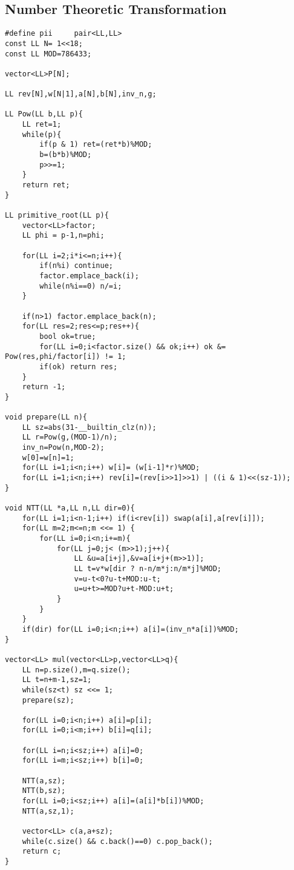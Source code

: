 \documentclass[10pt,a4paper,onesided]{article}
\begin{document}
\begin{multicols*}{3}
\subsection{Number Theoretic Transformation}
\begin{lstlisting}
#define pii     pair<LL,LL>
const LL N= 1<<18;
const LL MOD=786433;

vector<LL>P[N];

LL rev[N],w[N|1],a[N],b[N],inv_n,g;

LL Pow(LL b,LL p){
    LL ret=1;
    while(p){
        if(p & 1) ret=(ret*b)%MOD;
        b=(b*b)%MOD;
        p>>=1;
    }
    return ret;
}

LL primitive_root(LL p){
    vector<LL>factor;
    LL phi = p-1,n=phi;

    for(LL i=2;i*i<=n;i++){
        if(n%i) continue;
        factor.emplace_back(i);
        while(n%i==0) n/=i;
    }

    if(n>1) factor.emplace_back(n);
    for(LL res=2;res<=p;res++){
        bool ok=true;
        for(LL i=0;i<factor.size() && ok;i++) ok &= Pow(res,phi/factor[i]) != 1;
        if(ok) return res;
    }
    return -1;
}

void prepare(LL n){
    LL sz=abs(31-__builtin_clz(n));
    LL r=Pow(g,(MOD-1)/n);
    inv_n=Pow(n,MOD-2);
    w[0]=w[n]=1;
    for(LL i=1;i<n;i++) w[i]= (w[i-1]*r)%MOD;
    for(LL i=1;i<n;i++) rev[i]=(rev[i>>1]>>1) | ((i & 1)<<(sz-1));
}

void NTT(LL *a,LL n,LL dir=0){
    for(LL i=1;i<n-1;i++) if(i<rev[i]) swap(a[i],a[rev[i]]);
    for(LL m=2;m<=n;m <<= 1) {
        for(LL i=0;i<n;i+=m){
            for(LL j=0;j< (m>>1);j++){
                LL &u=a[i+j],&v=a[i+j+(m>>1)];
                LL t=v*w[dir ? n-n/m*j:n/m*j]%MOD;
                v=u-t<0?u-t+MOD:u-t;
                u=u+t>=MOD?u+t-MOD:u+t;
            }
        }
    }
    if(dir) for(LL i=0;i<n;i++) a[i]=(inv_n*a[i])%MOD;
}

vector<LL> mul(vector<LL>p,vector<LL>q){
    LL n=p.size(),m=q.size();
    LL t=n+m-1,sz=1;
    while(sz<t) sz <<= 1;
    prepare(sz);

    for(LL i=0;i<n;i++) a[i]=p[i];
    for(LL i=0;i<m;i++) b[i]=q[i];

    for(LL i=n;i<sz;i++) a[i]=0;
    for(LL i=m;i<sz;i++) b[i]=0;

    NTT(a,sz);
    NTT(b,sz);
    for(LL i=0;i<sz;i++) a[i]=(a[i]*b[i])%MOD;
    NTT(a,sz,1);

    vector<LL> c(a,a+sz);
    while(c.size() && c.back()==0) c.pop_back();
    return c;
}


\end{lstlisting}
\end{multicols*}
\end{document}
